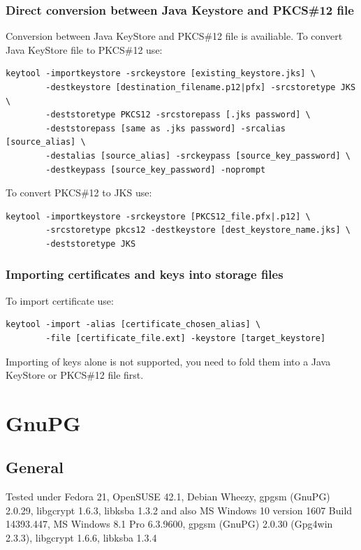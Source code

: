 \documentclass[10pt, a4paper]{report}
\begin{document}
{  \subsection{Direct conversion between Java Keystore and PKCS\#12 file}
Conversion between Java KeyStore and PKCS\#12 file is availiable. To convert Java KeyStore file to PKCS\#12 use:
\begin{verbatim}
keytool -importkeystore -srckeystore [existing_keystore.jks] \
        -destkeystore [destination_filename.p12|pfx] -srcstoretype JKS \
        -deststoretype PKCS12 -srcstorepass [.jks password] \
        -deststorepass [same as .jks password] -srcalias [source_alias] \
        -destalias [source_alias] -srckeypass [source_key_password] \
        -destkeypass [source_key_password] -noprompt
\end{verbatim}

To convert PKCS\#12 to JKS use:
\begin{verbatim}
keytool -importkeystore -srckeystore [PKCS12_file.pfx|.p12] \
        -srcstoretype pkcs12 -destkeystore [dest_keystore_name.jks] \
        -deststoretype JKS
\end{verbatim}

  
  \subsection{Importing certificates and keys into storage files}
To import certificate use:
\begin{verbatim}
keytool -import -alias [certificate_chosen_alias] \
        -file [certificate_file.ext] -keystore [target_keystore]  
\end{verbatim}

Importing of keys alone is not supported, you need to fold them into a Java KeyStore or PKCS\#12 file first.



\chapter{GnuPG}

\section{General}

Tested under Fedora 21, OpenSUSE 42.1, Debian Wheezy, gpgsm (GnuPG) 2.0.29, libgcrypt 1.6.3, libksba 1.3.2 and also MS Windows 10 version 1607 Build 14393.447, MS Windows 8.1 Pro 6.3.9600, gpgsm (GnuPG) 2.0.30 (Gpg4win 2.3.3), libgcrypt 1.6.6, libksba 1.3.4 

}
\end{document}
